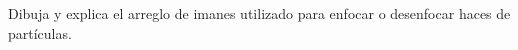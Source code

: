 \documentclass[./../main.tex]{subfiles}
\begin{document}
    \begin{exercise}
        Dibuja y explica el arreglo de imanes utilizado para enfocar o desenfocar haces de partículas.
    \end{exercise}
\end{document}
